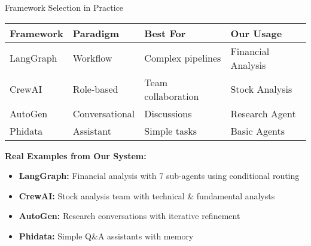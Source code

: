 \documentclass[aspectratio=169,11pt]{beamer}
\begin{document}
\begin{frame}{Framework Selection in Practice}
\begin{table}
\centering
\small
\begin{tabular}{llll}
\toprule
\textbf{Framework} & \textbf{Paradigm} & \textbf{Best For} & \textbf{Our Usage} \\
\midrule
LangGraph & Workflow & Complex pipelines & Financial Analysis \\
CrewAI & Role-based & Team collaboration & Stock Analysis \\
AutoGen & Conversational & Discussions & Research Agent \\
Phidata & Assistant & Simple tasks & Basic Agents \\
\bottomrule
\end{tabular}
\end{table}

\vspace{0.5cm}

\textbf{Real Examples from Our System:}
\begin{itemize}
    \item \textbf{LangGraph:} Financial analysis with 7 sub-agents using conditional routing
    \item \textbf{CrewAI:} Stock analysis team with technical \& fundamental analysts
    \item \textbf{AutoGen:} Research conversations with iterative refinement
    \item \textbf{Phidata:} Simple Q\&A assistants with memory
\end{itemize}
\end{frame}
\end{document}
